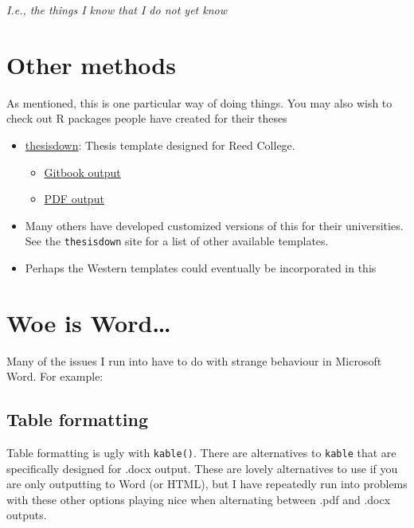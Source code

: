 \documentclass[
  12pt,
  oneside]{book}
\providecommand{\tightlist}{%
  \setlength{\itemsep}{0pt}\setlength{\parskip}{0pt}}
\numberwithin{figure}{chapter}
\begin{document}
\emph{I.e., the things I know that I do not yet know}

\hypertarget{other-methods}{%
\section{Other methods}\label{other-methods}}

As mentioned, this is one particular way of doing things. You may also wish to check out R packages people have created for their theses

\begin{itemize}
\tightlist
\item
  \href{https://github.com/ismayc/thesisdown}{thesisdown}: Thesis template designed for Reed College.

  \begin{itemize}
  \tightlist
  \item
    \href{https://thesisdown.netlify.com/}{Gitbook output}
  \item
    \href{https://github.com/ismayc/thesisdown_book/blob/gh-pages/thesis.pdf}{PDF output}
  \end{itemize}
\item
  Many others have developed customized versions of this for their universities. See the \texttt{thesisdown} site for a list of other available templates.
\item
  Perhaps the Western templates could eventually be incorporated in this
\end{itemize}

\hypertarget{woe-is-word}{%
\section{Woe is Word\ldots{}}\label{woe-is-word}}

Many of the issues I run into have to do with strange behaviour in Microsoft Word. For example:

\hypertarget{table-formatting}{%
\subsection{Table formatting}\label{table-formatting}}

Table formatting is ugly with \texttt{kable()}. There are alternatives to \texttt{kable} that are specifically designed for .docx output. These are lovely alternatives to use if you are only outputting to Word (or HTML), but I have repeatedly run into problems with these other options playing nice when alternating between .pdf and .docx outputs.
\end{document}
